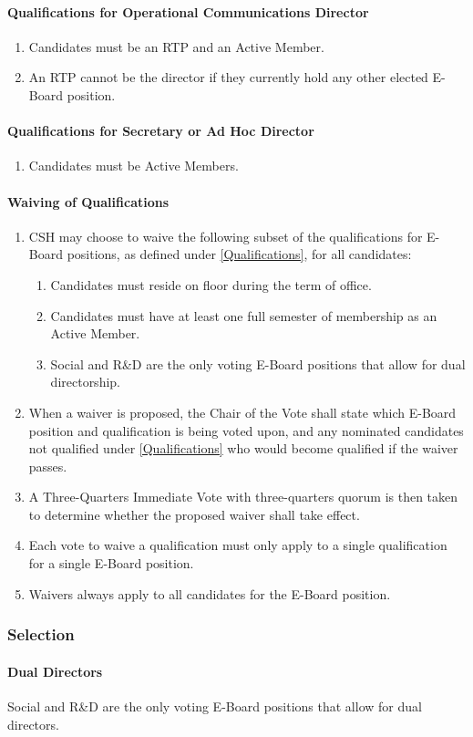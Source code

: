 \documentclass{article}
\newcommand{\asubsection}[1]{\subsubsection{#1} \label{#1}}
\newcommand{\asubsubsection}[1]{\paragraph{#1} \label{#1}}
\begin{document}
\asubsubsection{Qualifications for Operational Communications Director}
\begin{enumerate}
	\item Candidates must be an RTP and an Active Member.
	\item An RTP cannot be the director if they currently hold any other elected E-Board position. %
\end{enumerate}

\asubsubsection{Qualifications for Secretary or Ad Hoc Director}
\begin{enumerate}
	\item Candidates must be Active Members.
\end{enumerate}

\asubsubsection{Waiving of Qualifications}
\begin{enumerate}
	\item CSH may choose to waive the following subset of the qualifications for E-Board positions, as defined under \ref{Qualifications}, for all candidates:
	      \begin{enumerate}
		      \item Candidates must reside on floor during the term of office.
		      \item Candidates must have at least one full semester of membership as an Active Member.
		      \item Social and R\&D are the only voting E-Board positions that allow for dual directorship.
	      \end{enumerate}
	\item When a waiver is proposed, the Chair of the Vote shall state which E-Board position and qualification is being voted upon, and any nominated candidates not qualified under \ref{Qualifications} who would become qualified if the waiver passes.
	\item A Three-Quarters Immediate Vote with three-quarters quorum is then taken to determine whether the proposed waiver shall take effect.
	\item Each vote to waive a qualification must only apply to a single qualification for a single E-Board position.
	\item Waivers always apply to all candidates for the E-Board position.
\end{enumerate}

\asubsection{Selection}

\asubsubsection{Dual Directors}
Social and R\&D are the only voting E-Board positions that allow for dual directors.
\end{document}
